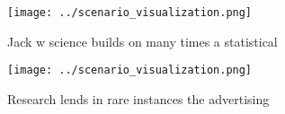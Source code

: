 \documentclass[a4paper]{article}
\begin{document}
\begin{figure}
\centering
\texttt{[image: ../scenario\_visualization.png]}
\caption{Jack w science builds on many times a statistical
}
\end{figure}
 
\begin{figure}
\centering
\texttt{[image: ../scenario\_visualization.png]}
\caption{Research lends in rare instances the advertising 
}
\end{figure}
 
\end{document}
